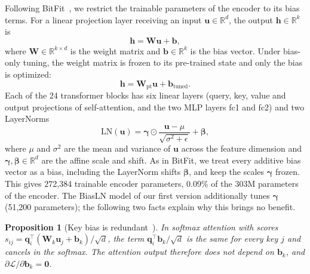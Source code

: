 \documentclass[fonts]{icst}
\newtheorem{proposition}{Proposition}
\begin{document}
Following BitFit~\cite{benzaken2022bitfit}, we restrict the trainable parameters of the encoder to its bias terms.
For a linear projection layer receiving an input $\mathbf{u} \in \mathbb{R}^{d}$, the output $\mathbf{h} \in \mathbb{R}^{k}$ is
\begin{equation}
    \mathbf{h} = \mathbf{W}\mathbf{u} + \mathbf{b},
\end{equation}
where $\mathbf{W} \in \mathbb{R}^{k \times d}$ is the weight matrix and $\mathbf{b} \in \mathbb{R}^{k}$ is the bias vector.
Under bias-only tuning, the weight matrix is frozen to its pre-trained state and only the bias is optimized:
\begin{equation}
    \mathbf{h} = \mathbf{W}_{\text{pt}}\mathbf{u} + \mathbf{b}_{\text{tuned}}.
\end{equation}
Each of the 24 transformer blocks has six linear layers (query, key, value and output projections of self-attention, and the two MLP layers fc1 and fc2) and two LayerNorms
\begin{equation}
    \mathrm{LN}(\mathbf{u}) = \boldsymbol{\gamma} \odot \frac{\mathbf{u} - \mu}{\sqrt{\sigma^2 + \epsilon}} + \boldsymbol{\beta},
    \label{eq:ln}
\end{equation}
where $\mu$ and $\sigma^2$ are the mean and variance of $\mathbf{u}$ across the feature dimension and $\boldsymbol{\gamma},\boldsymbol{\beta} \in \mathbb{R}^{d}$ are the affine scale and shift.
As in BitFit, we treat every additive bias vector as a bias, including the LayerNorm shifts $\boldsymbol{\beta}$, and keep the scales $\boldsymbol{\gamma}$ frozen. This gives 272{,}384 trainable encoder parameters, 0.09\% of the 303M parameters of the encoder. The BiasLN model of our first version additionally tunes $\boldsymbol{\gamma}$ (51{,}200 parameters); the following two facts explain why this brings no benefit.

\begin{proposition}[Key bias is redundant~\cite{namazifar2023bias}]
\label{prop:key}
In softmax attention with scores $s_{ij}=\mathbf{q}_i^\top(\mathbf{W}_k\mathbf{u}_j+\mathbf{b}_k)/\sqrt{d}$, the term $\mathbf{q}_i^\top\mathbf{b}_k/\sqrt{d}$ is the same for every key $j$ and cancels in the softmax. The attention output therefore does not depend on $\mathbf{b}_k$, and $\partial\mathcal{L}/\partial\mathbf{b}_k=\mathbf{0}$.
\end{proposition}
\end{document}
